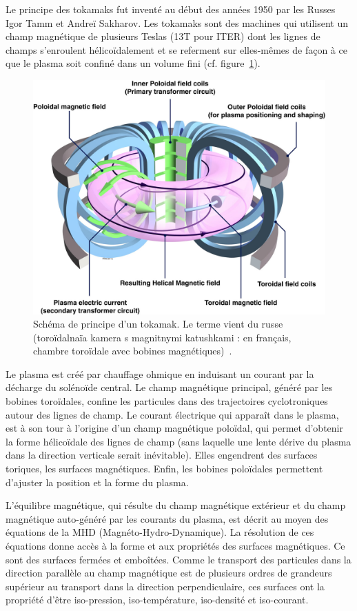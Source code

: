 \begin{refsection}
Le principe des tokamaks fut inventé au début des années 1950 par les Russes Igor Tamm et
Andreï Sakharov. Les tokamaks sont des machines qui utilisent
un champ magnétique de plusieurs Teslas (13T pour ITER) dont les lignes de
champs s'enroulent hélicoïdalement et se referment sur elles-mêmes de façon à ce que le plasma soit
confiné dans un volume fini (cf. figure~\ref{tokamak}).
\begin{figure}[!htb]
    \centering
	\includegraphics[height=0.75\textwidth]{figures/1-tokamak.jpg}
	\caption{Schéma de principe d'un tokamak. Le terme vient du
russe (toroïdalnaïa kamera s magnitnymi katushkami : en français, chambre toroïdale avec bobines
magnétiques)~\parencite{efda}.}\label{tokamak}
\end{figure}

Le plasma  est créé par chauffage ohmique en induisant un courant
par la décharge du solénoïde central. Le champ magnétique principal, généré
par les bobines toroïdales, confine les particules dans des trajectoires
cyclotroniques autour des lignes de champ. Le courant électrique qui apparaît
dans le plasma, est à son tour à l'origine d'un champ magnétique poloïdal, qui
permet d'obtenir la forme hélicoïdale des lignes de champ (sans laquelle
une lente dérive du plasma dans la direction verticale serait inévitable). Elles
engendrent des surfaces toriques, les surfaces magnétiques.
Enfin, les bobines poloïdales permettent d'ajuster la position et la forme du
plasma.

L'équilibre magnétique, qui résulte du champ magnétique extérieur et du champ
magnétique auto-généré par les courants du plasma, est décrit au moyen des
équations de la MHD (Magnéto-Hydro-Dynamique).
La résolution de ces équations donne accès à la forme et aux propriétés des
surfaces magnétiques. Ce sont des surfaces fermées et emboîtées. Comme le
transport des particules dans la direction parallèle au champ magnétique est de
plusieurs ordres de grandeurs supérieur au transport dans la direction
perpendiculaire, ces surfaces ont la propriété d'être iso-pression,
iso-température, iso-densité et iso-courant.


\end{refsection}
